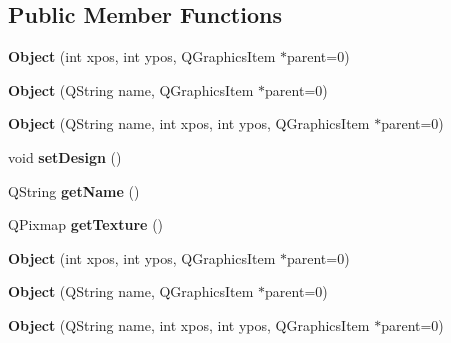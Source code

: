 \subsection*{Public Member Functions}
\begin{DoxyCompactItemize}
\item 
\hypertarget{class_object_a839274094bb6e2065aaeecd942d5141c}{}{\bfseries Object} (int xpos, int ypos, Q\+Graphics\+Item $\ast$parent=0)\label{class_object_a839274094bb6e2065aaeecd942d5141c}

\item 
\hypertarget{class_object_a541b501b7235cb63dfe3e0792458a1e1}{}{\bfseries Object} (Q\+String name, Q\+Graphics\+Item $\ast$parent=0)\label{class_object_a541b501b7235cb63dfe3e0792458a1e1}

\item 
\hypertarget{class_object_a41f72b673ad11a00f079cd326a857feb}{}{\bfseries Object} (Q\+String name, int xpos, int ypos, Q\+Graphics\+Item $\ast$parent=0)\label{class_object_a41f72b673ad11a00f079cd326a857feb}

\item 
\hypertarget{class_object_a64d92ae18b1e70a8435690fe6fccf1fd}{}void {\bfseries set\+Design} ()\label{class_object_a64d92ae18b1e70a8435690fe6fccf1fd}

\item 
\hypertarget{class_object_a13fe059222e66ea54aa3f6f8615a3d72}{}Q\+String {\bfseries get\+Name} ()\label{class_object_a13fe059222e66ea54aa3f6f8615a3d72}

\item 
\hypertarget{class_object_a2678fa7a8ab432607b228e8d311f2873}{}Q\+Pixmap {\bfseries get\+Texture} ()\label{class_object_a2678fa7a8ab432607b228e8d311f2873}

\item 
\hypertarget{class_object_a839274094bb6e2065aaeecd942d5141c}{}{\bfseries Object} (int xpos, int ypos, Q\+Graphics\+Item $\ast$parent=0)\label{class_object_a839274094bb6e2065aaeecd942d5141c}

\item 
\hypertarget{class_object_a541b501b7235cb63dfe3e0792458a1e1}{}{\bfseries Object} (Q\+String name, Q\+Graphics\+Item $\ast$parent=0)\label{class_object_a541b501b7235cb63dfe3e0792458a1e1}

\item 
\hypertarget{class_object_a41f72b673ad11a00f079cd326a857feb}{}{\bfseries Object} (Q\+String name, int xpos, int ypos, Q\+Graphics\+Item $\ast$parent=0)\label{class_object_a41f72b673ad11a00f079cd326a857feb}


\end{DoxyCompactItemize}

